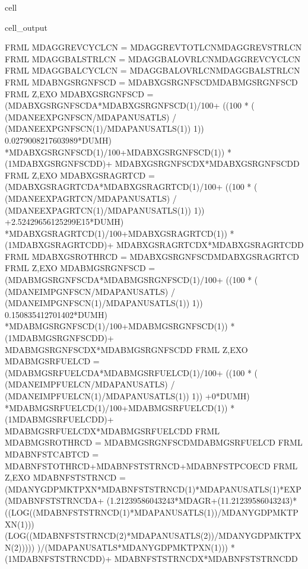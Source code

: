 \documentclass[letterpaper,10pt,english]{jupyterBook}
\begin{document}
\begin{sphinxuseclass}{cell}
\begin{sphinxVerbatimOutput}
\begin{sphinxuseclass}{cell_output}
\begin{sphinxVerbatim}[commandchars=\\\{\}]
FRML  \PYGZlt{}\PYGZgt{} MDAGGREVCYCLCN = MDAGGREVTOTLCN\PYGZhy{}MDAGGREVSTRLCN \PYGZdl{}
FRML  \PYGZlt{}\PYGZgt{} MDAGGBALSTRLCN = MDAGGBALOVRLCN\PYGZhy{}MDAGGREVCYCLCN \PYGZdl{}
FRML  \PYGZlt{}\PYGZgt{} MDAGGBALCYCLCN = MDAGGBALOVRLCN\PYGZhy{}MDAGGBALSTRLCN \PYGZdl{}
FRML  \PYGZlt{}\PYGZgt{} MDABNGSRGNFSCD = MDABXGSRGNFSCD\PYGZhy{}MDABMGSRGNFSCD \PYGZdl{}
FRML \PYGZlt{}Z,EXO\PYGZgt{} MDABXGSRGNFSCD = (MDABXGSRGNFSCD\PYGZus{}A*MDABXGSRGNFSCD(\PYGZhy{}1)/100+ ((100 * ( (MDANEEXPGNFSCN/MDAPANUSATLS) / (MDANEEXPGNFSCN(\PYGZhy{}1)/MDAPANUSATLS(\PYGZhy{}1)) \PYGZhy{}1)) \PYGZhy{}0.0279008217603989*DUMH) *MDABXGSRGNFSCD(\PYGZhy{}1)/100+MDABXGSRGNFSCD(\PYGZhy{}1)) * (1\PYGZhy{}MDABXGSRGNFSCD\PYGZus{}D)+ MDABXGSRGNFSCD\PYGZus{}X*MDABXGSRGNFSCD\PYGZus{}D  \PYGZdl{}
FRML \PYGZlt{}Z,EXO\PYGZgt{} MDABXGSRAGRTCD = (MDABXGSRAGRTCD\PYGZus{}A*MDABXGSRAGRTCD(\PYGZhy{}1)/100+ ((100 * ( (MDANEEXPAGRTCN/MDAPANUSATLS) / (MDANEEXPAGRTCN(\PYGZhy{}1)/MDAPANUSATLS(\PYGZhy{}1)) \PYGZhy{}1)) +2.52429656125299E\PYGZhy{}15*DUMH) *MDABXGSRAGRTCD(\PYGZhy{}1)/100+MDABXGSRAGRTCD(\PYGZhy{}1)) * (1\PYGZhy{}MDABXGSRAGRTCD\PYGZus{}D)+ MDABXGSRAGRTCD\PYGZus{}X*MDABXGSRAGRTCD\PYGZus{}D  \PYGZdl{}
FRML  \PYGZlt{}\PYGZgt{} MDABXGSROTHRCD = MDABXGSRGNFSCD\PYGZhy{}MDABXGSRAGRTCD \PYGZdl{}
FRML \PYGZlt{}Z,EXO\PYGZgt{} MDABMGSRGNFSCD = (MDABMGSRGNFSCD\PYGZus{}A*MDABMGSRGNFSCD(\PYGZhy{}1)/100+ ((100 * ( (MDANEIMPGNFSCN/MDAPANUSATLS) / (MDANEIMPGNFSCN(\PYGZhy{}1)/MDAPANUSATLS(\PYGZhy{}1)) \PYGZhy{}1)) \PYGZhy{}0.150835412701402*DUMH) *MDABMGSRGNFSCD(\PYGZhy{}1)/100+MDABMGSRGNFSCD(\PYGZhy{}1)) * (1\PYGZhy{}MDABMGSRGNFSCD\PYGZus{}D)+ MDABMGSRGNFSCD\PYGZus{}X*MDABMGSRGNFSCD\PYGZus{}D  \PYGZdl{}
FRML \PYGZlt{}Z,EXO\PYGZgt{} MDABMGSRFUELCD = (MDABMGSRFUELCD\PYGZus{}A*MDABMGSRFUELCD(\PYGZhy{}1)/100+ ((100 * ( (MDANEIMPFUELCN/MDAPANUSATLS) / (MDANEIMPFUELCN(\PYGZhy{}1)/MDAPANUSATLS(\PYGZhy{}1)) \PYGZhy{}1)) +0*DUMH) *MDABMGSRFUELCD(\PYGZhy{}1)/100+MDABMGSRFUELCD(\PYGZhy{}1)) * (1\PYGZhy{}MDABMGSRFUELCD\PYGZus{}D)+ MDABMGSRFUELCD\PYGZus{}X*MDABMGSRFUELCD\PYGZus{}D  \PYGZdl{}
FRML  \PYGZlt{}\PYGZgt{} MDABMGSROTHRCD = MDABMGSRGNFSCD\PYGZhy{}MDABMGSRFUELCD \PYGZdl{}
FRML  \PYGZlt{}\PYGZgt{} MDABNFSTCABTCD = MDABNFSTOTHRCD+MDABNFSTSTRNCD+MDABNFSTPCOECD \PYGZdl{}
FRML \PYGZlt{}Z,EXO\PYGZgt{} MDABNFSTSTRNCD = (MDANYGDPMKTPXN*MDABNFSTSTRNCD(\PYGZhy{}1)*MDAPANUSATLS(\PYGZhy{}1)*EXP(MDABNFSTSTRNCD\PYGZus{}A+ (1.21239586043243*MDAGR+(1\PYGZhy{}1.21239586043243)*((LOG((MDABNFSTSTRNCD(\PYGZhy{}1)*MDAPANUSATLS(\PYGZhy{}1))/MDANYGDPMKTPXN(\PYGZhy{}1)))\PYGZhy{}(LOG((MDABNFSTSTRNCD(\PYGZhy{}2)*MDAPANUSATLS(\PYGZhy{}2))/MDANYGDPMKTPXN(\PYGZhy{}2))))) )/(MDAPANUSATLS*MDANYGDPMKTPXN(\PYGZhy{}1))) * (1\PYGZhy{}MDABNFSTSTRNCD\PYGZus{}D)+ MDABNFSTSTRNCD\PYGZus{}X*MDABNFSTSTRNCD\PYGZus{}D  \PYGZdl{}

\end{sphinxVerbatim}
\end{sphinxuseclass}
\end{sphinxVerbatimOutput}
\end{sphinxuseclass}
\end{document}
